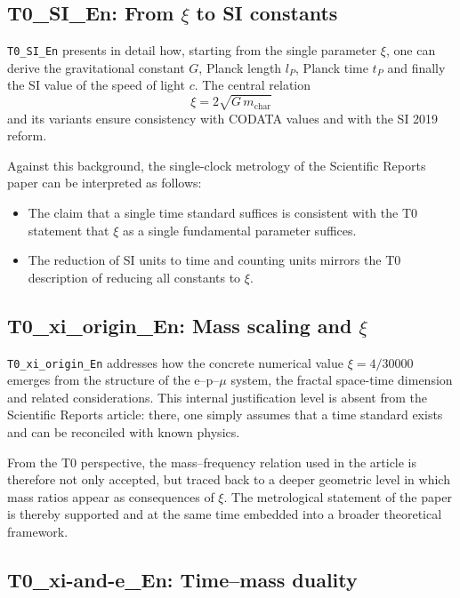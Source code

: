 \subsection{T0\_SI\_En: From $\xi$ to SI constants}

\texttt{T0\_SI\_En} presents in detail how, starting from the single parameter
$\xi$, one can derive the gravitational constant $G$, Planck length $l_P$,
Planck time $t_P$ and finally the SI value of the speed of light $c$. The
central relation
\begin{equation}
  \xi = 2\sqrt{G \, m_{\text{char}}}
\end{equation}
and its variants ensure consistency with CODATA values and with the SI 2019
reform.

Against this background, the single-clock metrology of the Scientific Reports
paper can be interpreted as follows:
\begin{itemize}
  \item The claim that a single time standard suffices is consistent with the
        T0 statement that $\xi$ as a single fundamental parameter suffices.
  \item The reduction of SI units to time and counting units mirrors the
        T0 description of reducing all constants to $\xi$.
\end{itemize}

\subsection{T0\_xi\_origin\_En: Mass scaling and $\xi$}

\texttt{T0\_xi\_origin\_En} addresses how the concrete numerical value
$\xi = 4/30000$ emerges from the structure of the e–p–$\mu$ system, the
fractal space-time dimension and related considerations. This internal
justification level is absent from the Scientific Reports article: there, one
simply assumes that a time standard exists and can be reconciled with known
physics.

From the T0 perspective, the mass–frequency relation used in the article is
therefore not only accepted, but traced back to a deeper geometric level in
which mass ratios appear as consequences of $\xi$. The metrological statement
of the paper is thereby supported and at the same time embedded into a broader
theoretical framework.

\subsection{T0\_xi-and-e\_En: Time–mass duality}

